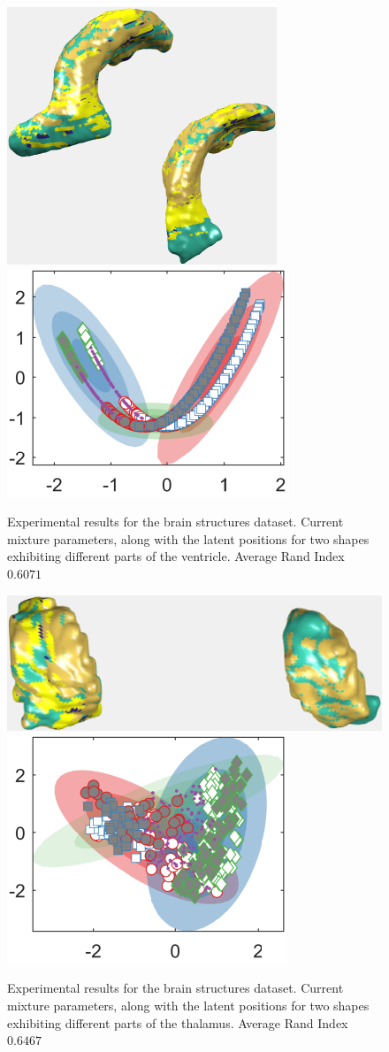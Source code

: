 \documentclass[]{article}
\begin{document}
\begin{figure}[ht!]
	\centering
	
	\includegraphics[width=0.45\linewidth]{img/ventricle1MVMMexp1}
	\includegraphics[width=0.35\linewidth]{img/ventricle1MVMMexp3}
	\caption{Experimental results for the brain structures dataset.  Current mixture parameters, along with the latent positions for two shapes exhibiting different parts of the ventricle. Average Rand Index $0.6071$ }
	\label{fig:brainV}
\end{figure}

\begin{figure}[ht!]
	\centering
	
	\includegraphics[width=0.45\linewidth]{img/thalamus1MVMMexp1}
	\includegraphics[width=0.35\linewidth]{img/thalamus1MVMMexp3}
	\caption{Experimental results for the brain structures dataset.  Current mixture parameters, along with the latent positions for two shapes exhibiting different parts of the thalamus. Average Rand Index $0.6467$ }
	\label{fig:brainT}
\end{figure}
\end{document}
